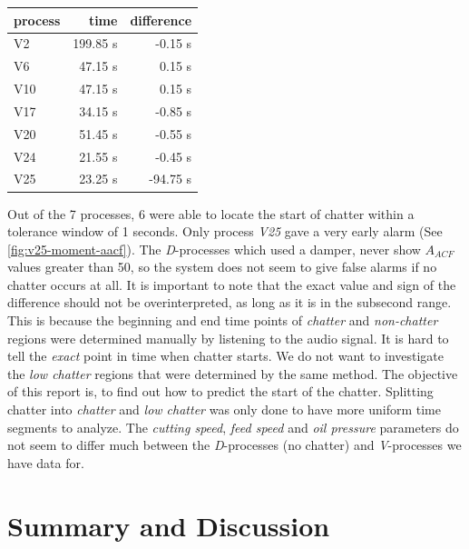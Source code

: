 \documentclass[12 pt]{scrartcl}
\begin{document}
\begin{table}[ht]
  \centering
  \label{tab:pointdiff}
  \begin{tabular}{l|rr}
    \\
    process & time     & difference \\
    \hline
    V2      & 199.85 s & -0.15 s    \\
    V6      & 47.15 s  & 0.15 s     \\
    V10     & 47.15 s  & 0.15 s     \\
    V17     & 34.15 s  & -0.85 s    \\
    V20     & 51.45 s  & -0.55 s    \\
    V24     & 21.55 s  & -0.45 s    \\
    V25     & 23.25 s  & -94.75 s   \\
  \end{tabular}
\end{table}

Out of the 7 processes, 6 were able to locate the start of chatter within a tolerance window of 1 seconds. Only process \emph{V25} gave a very early alarm (See \ref{fig:v25-moment-aacf}). The \emph{D}-processes which used a damper, never show $A_{ACF}$ values greater than 50, so the system does not seem to give false alarms if no chatter occurs at all.
It is important to note that the exact value and sign of the difference should not be overinterpreted, as long as it is in the subsecond range. This is because the beginning and end time points of \emph{chatter} and \emph{non-chatter} regions were determined manually by listening to the audio signal. It is hard to tell the \emph{exact} point in time when chatter starts. We do not want to investigate the \emph{low chatter} regions that were determined by the same method. The objective of this report is, to find out how to predict the start of the chatter. Splitting chatter into \emph{chatter} and \emph{low chatter} was only done to have more uniform time segments to analyze.
The \emph{cutting speed}, \emph{feed speed} and \emph{oil pressure} parameters do not seem to differ much between the \emph{D}-processes (no chatter) and \emph{V}-processes we have data for.

\section{Summary and Discussion}
\end{document}
